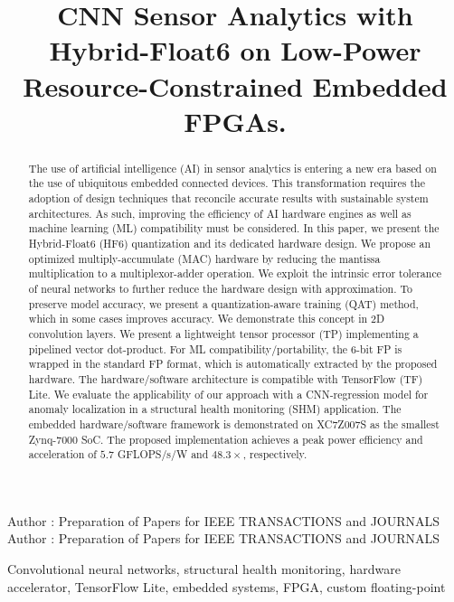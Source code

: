\title {CNN Sensor Analytics with Hybrid-Float6 on Low-Power Resource-Constrained Embedded FPGAs.}



\markboth
{Author \headeretal: Preparation of Papers for IEEE TRANSACTIONS and JOURNALS}
{Author \headeretal: Preparation of Papers for IEEE TRANSACTIONS and JOURNALS}


\begin{abstract}
The use of artificial intelligence (AI) in sensor analytics is entering a new era based on the use of ubiquitous embedded connected devices. This transformation requires the adoption of design techniques that reconcile accurate results with sustainable system architectures. As such, improving the efficiency of AI hardware engines as well as machine learning (ML) compatibility must be considered. In this paper, we present the Hybrid-Float6 (HF6) quantization and its dedicated hardware design. We propose an optimized multiply-accumulate (MAC) hardware by reducing the mantissa multiplication to a multiplexor-adder operation. We exploit the intrinsic error tolerance of neural networks to further reduce the hardware design with approximation. To preserve model accuracy, we present a quantization-aware training (QAT) method, which in some cases improves accuracy. We demonstrate this concept in 2D convolution layers. We present a lightweight tensor processor (TP) implementing a pipelined vector dot-product. For ML compatibility/portability, the 6-bit FP is wrapped in the standard FP format, which is automatically extracted by the proposed hardware. The hardware/software architecture is compatible with TensorFlow (TF) Lite. We evaluate the applicability of our approach with a CNN-regression model for anomaly localization in a structural health monitoring (SHM) application. The embedded hardware/software framework is demonstrated on XC7Z007S as the smallest Zynq-7000 SoC. The proposed implementation achieves a peak power efficiency and acceleration of $5.7$ GFLOPS/s/W and $48.3\times$, respectively.
\end{abstract}

\begin{keywords}
Convolutional neural networks, structural health monitoring, hardware accelerator, TensorFlow Lite, embedded systems, FPGA, custom floating-point
\end{keywords}

\titlepgskip=-15pt

\maketitle